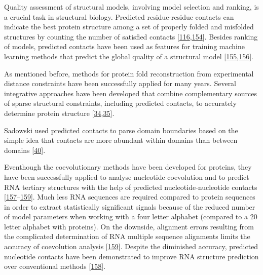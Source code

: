 \documentclass[11pt,a4paper,twoside]{book}
\theoremstyle{definition}
\theoremstyle{definition}
\theoremstyle{remark}
\begin{document}
Quality assessment of structural models, involving model selection and
ranking, is a crucial task in structural biology. Predicted
residue-residue contacts can indicate the best protein structure among a
set of properly folded and misfolded structures by counting the number
of satisfied contacts
{[}\protect\hyperlink{ref-Tress2010}{116},\protect\hyperlink{ref-Wozniak2017}{154}{]}.
Besides ranking of models, predicted contacts have been used as features
for training machine learning methods that predict the global quality of
a structural model
{[}\protect\hyperlink{ref-Cao2016}{155},\protect\hyperlink{ref-Terashi2014a}{156}{]}.

As mentioned before, methods for protein fold reconstruction from
experimental distance constraints have been successfully applied for
many years. Several integrative approaches have been developed that
combine complementary sources of sparse structural constraints,
including predicted contacts, to accurately determine protein structure
{[}\protect\hyperlink{ref-Ward2013}{34},\protect\hyperlink{ref-Tang2015}{35}{]}.

Sadowski used predicted contacts to parse domain boundaries based on the
simple idea that contacts are more abundant within domains than between
domains {[}\protect\hyperlink{ref-Sadowski2013}{40}{]}.

Eventhough the coevolutionary methods have been developed for proteins,
they have been successfully applied to analyse nucleotide coevolution
and to predict RNA tertiary structures with the help of predicted
nucleotide-nucleotide contacts
{[}\protect\hyperlink{ref-Nawy2016}{157}--\protect\hyperlink{ref-DeLeonardis2015a}{159}{]}.
Much less RNA sequences are required compared to protein sequences in
order to extract statistically significant signals because of the
reduced number of model parameters when working with a four letter
alphabet (compared to a 20 letter alphabet with proteins). On the
downside, alignment errors resulting from the complicated determination
of RNA multiple sequence alignments limits the accuracy of coevolution
analysis {[}\protect\hyperlink{ref-DeLeonardis2015a}{159}{]}. Despite
the diminished accuracy, predicted nucleotide contacts have been
demonstrated to improve RNA structure prediction over conventional
methods {[}\protect\hyperlink{ref-Weinreb2015}{158}{]}.
\end{document}

